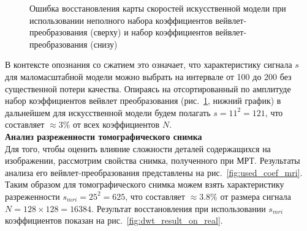 \documentclass[14pt]{matmex-diploma}
\begin{document}
\begin{figure}[h]
    \centering
    \caption{Ошибка восстановления карты скоростей искусственной модели при использовании неполного набора коэффициентов вейвлет-преобразования (сверху) и набор коэффициентов вейвлет-преобразования (снизу)}
    \label{fig:used_coeff}  
\end{figure}

В контексте опознания со сжатием это означает, что характеристику сигнала $s$ для маломасштабной модели можно выбрать на интервале от 100 до 200 без существенной потери качества. Опираясь на отсортированный по амплитуде набор коэффициентов вейвлет преобразования (рис.~\ref{fig:used_coeff}, нижний график) в дальнейшем для искусственной модели будем полагать $s=11^2 = 121 $, что составляет $\approx 3\%$ от всех коэффициентов $N$.\\

\textbf{Анализ разреженности томографического снимка} \\
Для того, чтобы оценить влияние сложности деталей содержащихся на изображении, рассмотрим свойства снимка, полученного при МРТ. Результаты анализа его вейвлет-преобразования представлены на рис.~\ref{fig:used_coef_mri}. Таким образом для томографического снимка можем взять характеристику разреженности $s_{mri} = 25^2 = 625$, что составляет $\approx 3.8\%$ от размера сигнала $N=128\times 128=16384$. Результат восстановления при использовании $s_{mri}$ коэффициентов показан на рис.~\ref{fig:dwt_result_on_real}.
\end{document}
